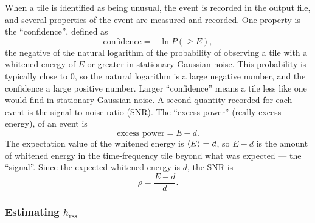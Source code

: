 \documentclass[10pt]{article}
\begin{document}
When a tile is identified as being unusual, the event is recorded in the
output file, and several properties of the event are measured and recorded.
One property is the ``confidence'', defined as
\begin{equation}
\text{confidence}
   = -\ln P(\geq E),
\end{equation}
the negative of the natural logarithm of the probability of observing a
tile with a whitened energy of \(E\) or greater in stationary Gaussian
noise.  This probability is typically close to 0, so the natural logarithm
is a large negative number, and the confidence a large positive number.
Larger ``confidence'' means a tile less like one would find in stationary
Gaussian noise.  A second quantity recorded for each event is the
signal-to-noise ratio (SNR).  The ``excess power'' (really excess energy),
of an event is
\begin{equation}
\text{excess power}
   = E - d.
\end{equation}
The expectation value of the whitened energy is \(\left\langle E\right\rangle = d\), so \(E -
d\) is the amount of whitened energy in the time-frequency tile beyond what
was expected --- the ``signal''.  Since the expected whitened energy is
\(d\), the SNR is
\begin{equation}
\rho
   = \frac{E - d}{d}.
\end{equation}


\subsubsection{Estimating \(h_{\text{rss}}\)}
\end{document}
